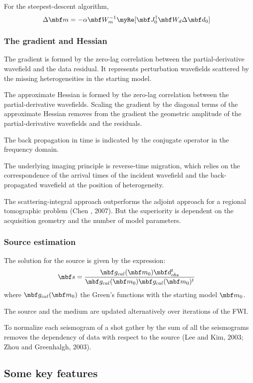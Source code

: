 For the steepest-descent algorithm,
\[ \Delta\mbf m=-\alpha\mbf W_m^{-1}\myRe[\mbf J_0^\dagger\mbf W_d\Delta\mbf d_0] \]

\subsubsection{The gradient and Hessian}
The gradient is formed by the zero-lag correlation between
the partial-derivative wavefield and the data residual.
It represents perturbation wavefields scattered by the missing heterogeneities
in the starting model.

The approximate Hessian is formed by the zero-lag correlation between
the partial-derivative wavefields.
Scaling the gradient by the diagonal terms of the approximate Hessian
removes from the gradient the geometric amplitude of the partial-derivative
wavefields and the residuals.

The back propagation in time is indicated by the conjugate operator
in the frequency domain.

The underlying imaging principle is reverse-time migration, which relies on
the correspondence of the arrival times of the incident wavefield and
the back-propagated wavefield at the position of heterogeneity.

The scattering-integral approach outperforms the adjoint approach
for a regional tomographic problem (Chen \etal, 2007).
But the superiority is dependent on the acquisition geometry and
the number of model parameters.

\subsubsection{Source estimation}
The solution for the source is given by the expression:
\[ \mbf s=\frac{\mbf g_{cal}(\mbf m_0) \mbf d_{obs}^t}
  {\mbf g_{cal}(\mbf m_0) \mbf g_{cal}(\mbf m_0)^t} \]
where $\mbf g_{cal}(\mbf m_0)$ the Green's functions with
the starting model $\mbf m_0$.

The source and the medium are updated alternatively
over iterations of the FWI.

To normalize each seismogram of a shot gather by the sum of
all the seismograms removes the dependency of data with respect
to the source (Lee and Kim, 2003; Zhou and Greenhalgh, 2003).

\subsection{Some key features}

